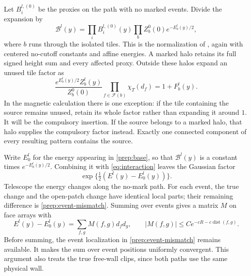 Let $B_i^{l,(0)}$ be the proxies on the path with no marked events.  Divide
the expansion by
\begin{equation}\label{prep:base}
 \mathcal B^l(y)=\prod_iB_i^{l,(0)}(y)
                   \prod_b Z_b^0(0)e^{-E_b^l(y)/2},
\end{equation}
where $b$ runs through the isolated tiles.  This is the normalization
of \cite[Equation (9.7)]{B}, again with centered no-cutoff
constants and affine energies.  A marked halo retains its full signed
height sum and every affected proxy.  Outside these halos expand an
unused tile factor as
\begin{equation}\label{prep:tile-factor}
 \frac{e^{E_b^l(y)/2}Z_b^l(y)}{Z_b^0(0)}
          \prod_{f\in\mathcal F(b)}\chi_T(d_f)=1+F_b^l(y).
\end{equation}
In the magnetic calculation there is one exception: if the tile
containing the source remains unused, retain its whole factor rather
than expanding it around $1$.  It will be the compulsory insertion.
If the source belongs to a marked halo, that halo supplies the
compulsory factor instead.  Exactly one connected component of every
resulting pattern contains the source.

Write $E_0^l$ for the energy appearing in \eqref{prep:base}, so that
$\mathcal B^l(y)$ is a constant times $e^{-E_0^l(y)/2}$.  Combining it
with \eqref{eq:interaction} leaves the Gaussian factor
\begin{equation}\label{prep:mismatch-factor}
                    \exp\{\tfrac12(E^l(y)-E_0^l(y))\}.
\end{equation}
Telescope the energy changes along the no-mark path.  For each event,
the true change and the open-patch change have identical local parts;
their remaining difference is \eqref{prep:event-mismatch}.  Summing over
events gives a matrix $M$ on face arrays with
\begin{equation}\label{prep:link-matrix}
 E^l(y)-E_0^l(y)=\sum_{f,g}M(f,g)d_fd_g,
 \qquad |M(f,g)|\le Ce^{-cR-c\operatorname{dist}(f,g)}.
\end{equation}
Before summing, the event localization in
\eqref{prep:event-mismatch} remains available.  It makes the sum over
event positions uniformly convergent.  This argument also treats the
true free-wall clips, since both paths use the same physical wall.

